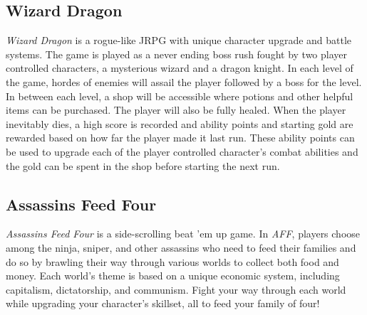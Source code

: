 \documentclass[12pt]{article}
\begin{document}
\subsection*{Wizard Dragon}
{\it Wizard Dragon} is a rogue-like JRPG with unique character upgrade and battle systems. The game is played as a never ending boss rush fought by two player controlled characters, a mysterious wizard and a dragon knight. In each level of the game, hordes of enemies will assail the player followed by a boss for the level. In between each level, a shop will be accessible where potions and other helpful items can be purchased. The player will also be fully healed. When the player inevitably dies, a high score is recorded and ability points and starting gold are rewarded based on how far the player made it last run. These ability points can be used to upgrade each of the player controlled character's combat abilities and the gold can be spent in the shop before starting the next run.

\subsection*{Assassins Feed Four}

{\it Assassins Feed Four} is a side-scrolling beat 'em up game. In {\it AFF},
players choose among the ninja, sniper, and other assassins who need to feed
their families and do so by brawling their way through various worlds to collect
both food and money. Each world's theme is based on a unique economic system,
including capitalism, dictatorship, and communism. Fight your way through each
world while upgrading your character's skillset, all to feed your family of
four!
\end{document}
